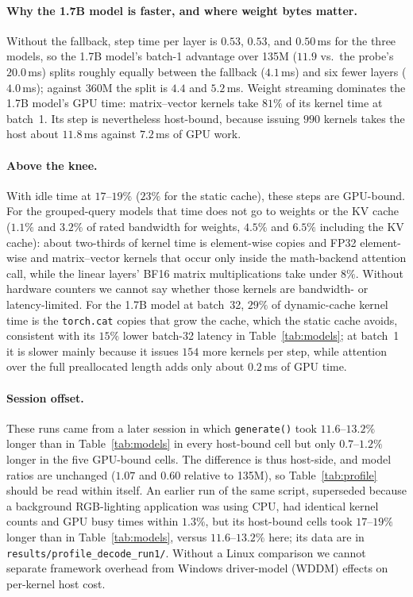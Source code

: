 \documentclass[11pt]{article}
\begin{document}
\paragraph{Why the 1.7B model is faster, and where weight bytes matter.}
Without the fallback, step time per layer is $0.53$, $0.53$, and $0.50$\,ms for the three models, so the 1.7B model's batch-1 advantage over 135M ($11.9$ vs.\ the probe's $20.0$\,ms) splits roughly equally between the fallback ($4.1$\,ms) and six fewer layers ($4.0$\,ms); against 360M the split is $4.4$ and $5.2$\,ms.
Weight streaming dominates the 1.7B model's GPU time: matrix--vector kernels take $81\%$ of its kernel time at batch~1.
Its step is nevertheless host-bound, because issuing $990$ kernels takes the host about $11.8$\,ms against $7.2$\,ms of GPU work.

\paragraph{Above the knee.}
With idle time at $17$--$19\%$ ($23\%$ for the static cache), these steps are GPU-bound.
For the grouped-query models that time does not go to weights or the KV cache ($1.1\%$ and $3.2\%$ of rated bandwidth for weights, $4.5\%$ and $6.5\%$ including the KV cache): about two-thirds of kernel time is element-wise copies and FP32 element-wise and matrix--vector kernels that occur only inside the math-backend attention call, while the linear layers' BF16 matrix multiplications take under $8\%$.
Without hardware counters we cannot say whether those kernels are bandwidth- or latency-limited.
For the 1.7B model at batch~32, $29\%$ of dynamic-cache kernel time is the \texttt{torch.cat} copies that grow the cache, which the static cache avoids, consistent with its $15\%$ lower batch-32 latency in Table~\ref{tab:models}; at batch~1 it is slower mainly because it issues $154$ more kernels per step, while attention over the full preallocated length adds only about $0.2$\,ms of GPU time.

\paragraph{Session offset.}
These runs came from a later session in which \texttt{generate()} took $11.6$--$13.2\%$ longer than in Table~\ref{tab:models} in every host-bound cell but only $0.7$--$1.2\%$ longer in the five GPU-bound cells.
The difference is thus host-side, and model ratios are unchanged ($1.07$ and $0.60$ relative to 135M), so Table~\ref{tab:profile} should be read within itself.
An earlier run of the same script, superseded because a background RGB-lighting application was using CPU, had identical kernel counts and GPU busy times within $1.3\%$, but its host-bound cells took $17$--$19\%$ longer than in Table~\ref{tab:models}, versus $11.6$--$13.2\%$ here; its data are in \texttt{results/profile\_decode\_run1/}.
Without a Linux comparison we cannot separate framework overhead from Windows driver-model (WDDM) effects on per-kernel host cost.
\end{document}
